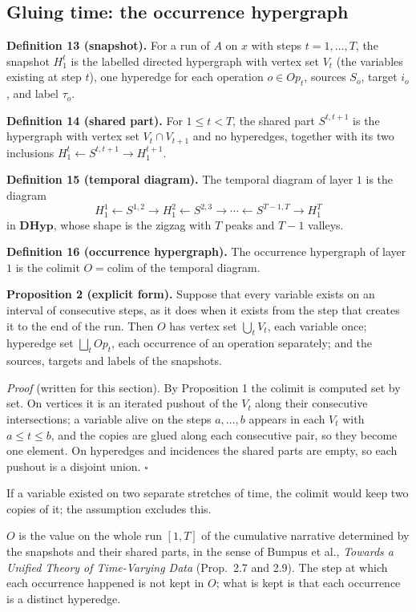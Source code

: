 \documentclass[11pt]{article}
\begin{document}
\subsection{Gluing time: the occurrence hypergraph}

\textbf{Definition 13 (snapshot).} For a run of $A$ on $x$ with steps $t=1,\dots,T$, the snapshot $H_1^t$ is the labelled directed hypergraph with vertex set $V_t$ (the variables existing at step $t$), one hyperedge for each operation $o\in Op_t$, sources $S_o$, target $i_o$, and label $\tau_o$.

\textbf{Definition 14 (shared part).} For $1\le t<T$, the shared part $S^{t,t+1}$ is the hypergraph with vertex set $V_t\cap V_{t+1}$ and no hyperedges, together with its two inclusions $H_1^t\leftarrow S^{t,t+1}\rightarrow H_1^{t+1}$.

\textbf{Definition 15 (temporal diagram).} The temporal diagram of layer $1$ is the diagram
\[ H_1^1\leftarrow S^{1,2}\rightarrow H_1^2\leftarrow S^{2,3}\rightarrow\cdots\leftarrow S^{T-1,T}\rightarrow H_1^T \]
in $\mathbf{DHyp}$, whose shape is the zigzag with $T$ peaks and $T-1$ valleys.

\textbf{Definition 16 (occurrence hypergraph).} The occurrence hypergraph of layer $1$ is the colimit $O=\mathrm{colim}$ of the temporal diagram.

\textbf{Proposition 2 (explicit form).} Suppose that every variable exists on an interval of consecutive steps, as it does when it exists from the step that creates it to the end of the run. Then $O$ has vertex set $\bigcup_t V_t$, each variable once; hyperedge set $\bigsqcup_t Op_t$, each occurrence of an operation separately; and the sources, targets and labels of the snapshots.

\emph{Proof} (written for this section). By Proposition 1 the colimit is computed set by set. On vertices it is an iterated pushout of the $V_t$ along their consecutive intersections; a variable alive on the steps $a,\dots,b$ appears in each $V_t$ with $a\le t\le b$, and the copies are glued along each consecutive pair, so they become one element. On hyperedges and incidences the shared parts are empty, so each pushout is a disjoint union. $\square$

If a variable existed on two separate stretches of time, the colimit would keep two copies of it; the assumption excludes this.

$O$ is the value on the whole run $[1,T]$ of the cumulative narrative determined by the snapshots and their shared parts, in the sense of Bumpus et al., \emph{Towards a Unified Theory of Time-Varying Data} (Prop.~2.7 and 2.9). The step at which each occurrence happened is not kept in $O$; what is kept is that each occurrence is a distinct hyperedge.
\end{document}
